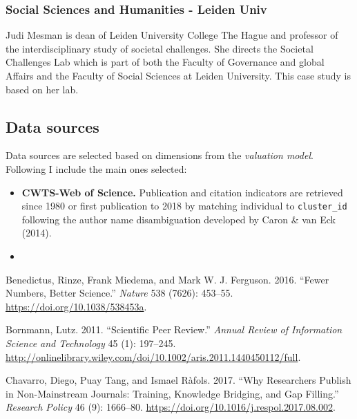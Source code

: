 \documentclass[]{elsarticle} %
\begin{document}
\hypertarget{social-sciences-and-humanities---leiden-univ}{%
\subsubsection{Social Sciences and Humanities - Leiden
Univ}\label{social-sciences-and-humanities---leiden-univ}}

Judi Mesman is dean of Leiden University College The Hague and professor
of the interdisciplinary study of societal challenges. She directs the
Societal Challenges Lab which is part of both the Faculty of Governance
and global Affairs and the Faculty of Social Sciences at Leiden
University. This case study is based on her lab.

\hypertarget{data-sources}{%
\subsection{Data sources}\label{data-sources}}

Data sources are selected based on dimensions from the \emph{valuation
model}. Following I include the main ones selected:

\begin{itemize}
\item
  \textbf{CWTS-Web of Science.} Publication and citation indicators are
  retrieved since 1980 or first publication to 2018 by matching
  individual to \texttt{cluster\_id} following the author name
  disambiguation developed by Caron \& van Eck (2014).
\item
\end{itemize}

\hypertarget{refs}{}
\leavevmode\hypertarget{ref-benedictusFewerNumbersBetter2016}{}%
Benedictus, Rinze, Frank Miedema, and Mark W. J. Ferguson. 2016. ``Fewer
Numbers, Better Science.'' \emph{Nature} 538 (7626): 453--55.
\url{https://doi.org/10.1038/538453a}.

\leavevmode\hypertarget{ref-bornmannScientificPeerReview2011}{}%
Bornmann, Lutz. 2011. ``Scientific Peer Review.'' \emph{Annual Review of
Information Science and Technology} 45 (1): 197--245.
\url{http://onlinelibrary.wiley.com/doi/10.1002/aris.2011.1440450112/full}.

\leavevmode\hypertarget{ref-chavarroWhyResearchersPublish2017}{}%
Chavarro, Diego, Puay Tang, and Ismael Ràfols. 2017. ``Why Researchers
Publish in Non-Mainstream Journals: Training, Knowledge Bridging, and
Gap Filling.'' \emph{Research Policy} 46 (9): 1666--80.
\url{https://doi.org/10.1016/j.respol.2017.08.002}.
\end{document}
